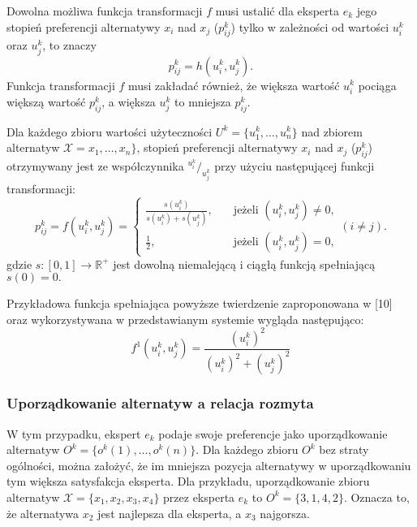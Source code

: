 Dowolna możliwa funkcja transformacji $f$ musi ustalić dla eksperta $e_k$ jego
stopień preferencji alternatywy $x_i$ nad $x_j$ ($p^k_{ij}$) tylko w zależności
od wartości $u^k_i$ oraz $u^k_j$, to znaczy 
\begin{equation}
p^k_{ij} = h(u^k_i, u^k_j).
\end{equation}
Funkcja transformacji $f$ musi zakładać również, że większa wartość $u^k_i$
pociąga większą wartość $p^k_{ij}$, a większa $u^k_j$ to mniejsza $p^k_{ij}.$

\begin{theorem}
Dla każdego zbioru wartości użyteczności $U^k = \{ u^k_1, \dotsc, u^k_n \}$ nad
zbiorem alternatyw $\mathcal{X} = x_1, \dotsc, x_n\}$, stopień preferencji
alternatywy $x_i$ nad $x_j$ ($p^k_{ij}$) otrzymywany jest ze współczynnika
$^{u^k_i}/_{u^k_j}$ przy użyciu następującej funkcji transformacji:
\begin{equation}
p^k_{ij} = f(u^k_i, u^k_j) =
  \left\{ 
	\begin{array}{ll}
	  \frac{s(u^k_i)}{s(u^k_i) + s(u^k_j)} , & \quad \textrm{jeżeli } (u^k_i,u^k_j)
	  \neq 0 ,
	  \\
      \frac{1}{2} , & \quad \textrm{jeżeli } (u^k_i,u^k_j) = 0,
  	\end{array} 
  \right. (i \neq j) .
\end{equation}
gdzie $s : [0,1] \rightarrow \mathbb{R}^+$ jest dowolną niemalejącą i ciągłą
funkcją spełniającą $s(0) = 0.$
\end{theorem}

Przykładowa funkcja spełniająca powyższe twierdzenie zaproponowana w [10] oraz
wykorzystywana w przedstawianym systemie wygląda następująco:
\begin{equation}
f^1(u^k_i,u^k_j) = \frac{(u^k_i)^2}{(u^k_i)^2 + (u^k_j)^2}
\end{equation}

\subsubsection{Uporządkowanie alternatyw a relacja rozmyta}
W tym przypadku, ekspert $e_k$ podaje swoje preferencje jako uporządkowanie
alternatyw $O^k = \{o^k(1), \dotsc, o^k(n)\}$. Dla każdego zbioru $O^k$ bez
straty ogólności, można założyć, że im mniejsza pozycja alternatywy w
uporządkowaniu tym większa satysfakcja eksperta. Dla przykładu, uporządkowanie
zbioru alternatyw $\mathcal{X} = \{x_1,x_2,x_3,x_4\}$ przez eksperta $e_k$ to
$O^k = \{3,1,4,2\}.$ Oznacza to, że alternatywa $x_2$ jest najlepsza dla
eksperta, a $x_3$ najgorsza.

